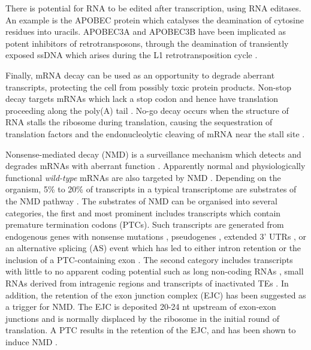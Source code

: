 \documentclass[12pt]{article}
\begin{document}
			There is potential for RNA to be edited after transcription, using RNA editases. %
			An example is the APOBEC protein which catalyses the deamination of cytosine residues into uracils.
			APOBEC3A and APOBEC3B have been implicated as potent inhibitors of retrotransposons, through the deamination of transiently exposed ssDNA which arises during the L1 retrotransposition cycle \citep{Bogerd06, Richardson14}. 
			
			Finally, mRNA decay can be used as an opportunity to degrade aberrant transcripts, protecting the cell from possibly toxic protein products.
			Non-stop decay targets mRNAs which lack a stop codon and hence have translation proceeding along the poly(A) tail \citep{Hoof02}.
			No-go decay occurs when the structure of RNA stalls the ribosome during translation, causing the sequestration of translation factors and the endonucleolytic cleaving of mRNA near the stall site \citep{Doma06}. 
			
			Nonsense-mediated decay (NMD) is a surveillance mechanism which detects and degrades mRNAs with aberrant function \citep{ Kervestin12, Lykke-Andersen14}.
			Apparently normal and physiologically functional \textit{wild-type} mRNAs are also targeted by NMD \citep{Schweingruber13}.
			Depending on the organism, 5\% to 20\% of transcripts in a typical transcriptome are substrates of the NMD pathway \citep{He15}.
			The substrates of NMD can be organised into several categories, the first and most prominent includes transcripts which contain premature termination codons (PTCs).
			Such transcripts are generated from endogenous genes with nonsense mutations \citep{Conti05}, pseudogenes \citep{Mcglincy08}, extended 3' UTRs \citep{Garneau07}, or an alternative splicing (AS) event which has led to either intron retention or the inclusion of a PTC-containing exon \citep{Ge14,Ni07}.
			The second category includes transcripts with little to no apparent coding potential such as long non-coding RNAs \citep{Lykke-Andersenb14}, small RNAs derived from intragenic regions \citep{Smith14} and transcripts of inactivated TEs \citep{He03}.
			In addition, the retention of the exon junction complex (EJC) has been suggested as a trigger for NMD. %
			The EJC is deposited 20-24 nt upstream of exon-exon junctions \citep{Le-Hir00} and is normally displaced by the ribosome in the initial round of translation.
			A PTC results in the retention of the EJC, and has been shown to induce NMD \citep{Gehring05, Lykke-Andersen01}. 
			
\end{document}
